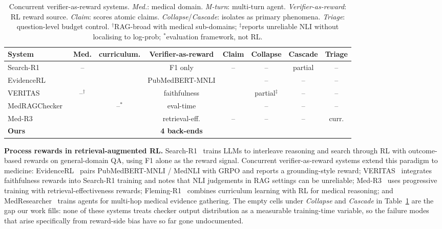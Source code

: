 \documentclass[11pt]{article}
\newcommand{\ck}{\checkmark}
\begin{document}
\begin{table}[t]
\centering\small
\setlength{\tabcolsep}{4pt}
\renewcommand{\arraystretch}{1.1}
\begin{tabular}{@{}lccccccc@{}}
\toprule
\textbf{System} 
  & \textbf{Med.} & curriculum. & \textbf{Verifier-as-reward} 
  & \textbf{Claim} & \textbf{Collapse} & \textbf{Cascade} & \textbf{Triage} \\
\midrule
Search-R1~\citep{jin2025search}           
  & -- & \ck & F1 only & -- & -- & partial & -- \\
EvidenceRL~\citep{evidencerl2025}         
  & \ck & \ck & PubMedBERT-MNLI & \ck & -- & -- & -- \\
VERITAS~\citep{xu2025beyond}              
  & --$^{\dagger}$ & \ck & faithfulness & \ck & partial$^{\ddagger}$ & -- & -- \\
MedRAGChecker~\citep{ji2026medragchecker} 
  & \ck & --$^{*}$ & eval-time & \ck & -- & -- & -- \\
Med-R3~\citep{lu2025med}                  
  & \ck & \ck & retrieval-eff. & -- & -- & -- & curr. \\
\midrule
\textbf{Ours} 
  & \ck & \ck & \textbf{4 back-ends} & \ck & \ck & \ck & \ck \\
\bottomrule
\end{tabular}
\caption{Concurrent verifier-as-reward systems. 
\textit{Med.}: medical domain. \textit{M-turn}: 
multi-turn agent. \textit{Verifier-as-reward}: RL 
reward source. \textit{Claim}: scores atomic claims. 
\textit{Collapse}/\textit{Cascade}: isolates as 
primary phenomena. \textit{Triage}: question-level 
budget control.
$^{\dagger}$RAG-broad with medical sub-domains; 
$^{\ddagger}$reports unreliable NLI without localising 
to log-prob; $^{*}$evaluation framework, not RL.}
\label{tab:concurrent}
\end{table}

\textbf{Process rewards in retrieval-augmented RL.}
Search-R1~\citep{jin2025search} trains LLMs to
interleave reasoning and search through RL with
outcome-based rewards on general-domain QA, using F1
alone as the reward signal. Concurrent
verifier-as-reward systems extend this paradigm to
medicine: EvidenceRL~\citep{evidencerl2025} pairs
PubMedBERT-MNLI / MedNLI with GRPO and reports a
grounding-style reward;
VERITAS~\citep{xu2025beyond} integrates faithfulness
rewards into Search-R1 training and notes that NLI
judgements in RAG settings can be unreliable;
Med-R3~\citep{lu2025med} uses progressive training
with retrieval-effectiveness rewards;
Fleming-R1~\citep{liu2025fleming} combines curriculum
learning with RL for medical reasoning; and
MedResearcher~\citep{yu2025medresearcher} trains
agents for multi-hop medical evidence gathering.
The empty cells under \textit{Collapse} and
\textit{Cascade} in Table~\ref{tab:concurrent} are
the gap our work fills: none of these systems treats
checker output distribution as a measurable
training-time variable, so the failure modes that
arise specifically from reward-side bias have so far
gone undocumented.
\end{document}
